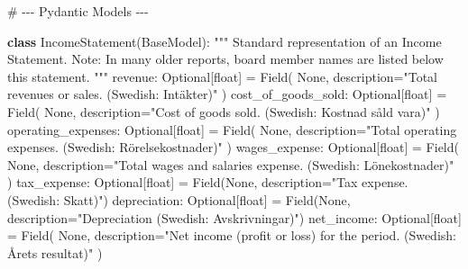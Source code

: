 \documentclass[
]{article}
\newenvironment{Shaded}{\begin{snugshade}}{\end{snugshade}}
\newcommand{\BuiltInTok}[1]{\textcolor[rgb]{0.00,0.23,0.31}{#1}}
\newcommand{\CommentTok}[1]{\textcolor[rgb]{0.37,0.37,0.37}{#1}}
\newcommand{\KeywordTok}[1]{\textcolor[rgb]{0.00,0.23,0.31}{\textbf{#1}}}
\newcommand{\NormalTok}[1]{\textcolor[rgb]{0.00,0.23,0.31}{#1}}
\newcommand{\OperatorTok}[1]{\textcolor[rgb]{0.37,0.37,0.37}{#1}}
\newcommand{\StringTok}[1]{\textcolor[rgb]{0.13,0.47,0.30}{#1}}
\newcommand{\VariableTok}[1]{\textcolor[rgb]{0.07,0.07,0.07}{#1}}
\begin{document}
\newpage{}

\begin{Shaded}
\begin{Highlighting}[]
\CommentTok{\# {-}{-}{-} Pydantic Models {-}{-}{-}}

\KeywordTok{class}\NormalTok{ IncomeStatement(BaseModel):}
    \CommentTok{"""}
\CommentTok{    Standard representation of an Income Statement.}
\CommentTok{    Note: In many older reports, board member names are listed below this statement.}
\CommentTok{    """}
\NormalTok{    revenue: Optional[}\BuiltInTok{float}\NormalTok{] }\OperatorTok{=}\NormalTok{ Field(}
        \VariableTok{None}\NormalTok{, description}\OperatorTok{=}\StringTok{"Total revenues or sales. (Swedish: Intäkter)"}
\NormalTok{    )}
\NormalTok{    cost\_of\_goods\_sold: Optional[}\BuiltInTok{float}\NormalTok{] }\OperatorTok{=}\NormalTok{ Field(}
        \VariableTok{None}\NormalTok{, description}\OperatorTok{=}\StringTok{"Cost of goods sold. (Swedish: Kostnad såld vara)"}
\NormalTok{    )}
\NormalTok{    operating\_expenses: Optional[}\BuiltInTok{float}\NormalTok{] }\OperatorTok{=}\NormalTok{ Field(}
        \VariableTok{None}\NormalTok{, description}\OperatorTok{=}\StringTok{"Total operating expenses. (Swedish: Rörelsekostnader)"}
\NormalTok{    )}
\NormalTok{    wages\_expense: Optional[}\BuiltInTok{float}\NormalTok{] }\OperatorTok{=}\NormalTok{ Field(}
        \VariableTok{None}\NormalTok{, description}\OperatorTok{=}\StringTok{"Total wages and salaries expense. (Swedish: Lönekostnader)"}
\NormalTok{    )}
\NormalTok{    tax\_expense: Optional[}\BuiltInTok{float}\NormalTok{] }\OperatorTok{=}\NormalTok{ Field(}\VariableTok{None}\NormalTok{, description}\OperatorTok{=}\StringTok{"Tax expense. (Swedish: Skatt)"}\NormalTok{)}
\NormalTok{    depreciation: Optional[}\BuiltInTok{float}\NormalTok{] }\OperatorTok{=}\NormalTok{ Field(}\VariableTok{None}\NormalTok{, description}\OperatorTok{=}\StringTok{"Depreciation (Swedish: Avskrivningar)"}\NormalTok{)}
\NormalTok{    net\_income: Optional[}\BuiltInTok{float}\NormalTok{] }\OperatorTok{=}\NormalTok{ Field(}
        \VariableTok{None}\NormalTok{, description}\OperatorTok{=}\StringTok{"Net income (profit or loss) for the period. (Swedish: Årets resultat)"}
\NormalTok{    )}



\end{Highlighting}
\end{Shaded}
\end{document}
